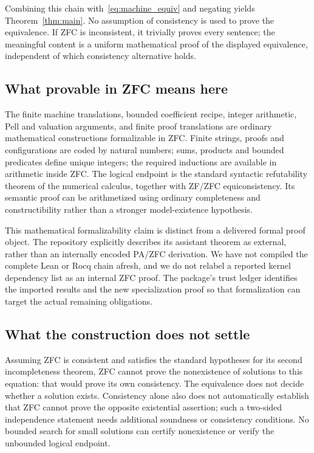 \documentclass[11pt]{article}
\begin{document}
Combining this chain with~\eqref{eq:machine_equiv} and negating yields Theorem~\ref{thm:main}. No assumption of consistency is used to prove the equivalence. If ZFC is inconsistent, it trivially proves every sentence; the meaningful content is a uniform mathematical proof of the displayed equivalence, independent of which consistency alternative holds.

\subsection{What provable in ZFC means here}
The finite machine translations, bounded coefficient recipe, integer arithmetic, Pell and valuation arguments, and finite proof translations are ordinary mathematical constructions formalizable in ZFC. Finite strings, proofs and configurations are coded by natural numbers; sums, products and bounded predicates define unique integers; the required inductions are available in arithmetic inside ZFC. The logical endpoint is the standard syntactic refutability theorem of the numerical calculus, together with ZF/ZFC equiconsistency. Its semantic proof can be arithmetized using ordinary completeness and constructibility rather than a stronger model-existence hypothesis.

This mathematical formalizability claim is distinct from a delivered formal proof object. The repository explicitly describes its assistant theorem as external, rather than an internally encoded PA/ZFC derivation. We have not compiled the complete Lean or Rocq chain afresh, and we do not relabel a reported kernel dependency list as an internal ZFC proof. The package's trust ledger identifies the imported results and the new specialization proof so that formalization can target the actual remaining obligations.

\subsection{What the construction does not settle}
Assuming ZFC is consistent and satisfies the standard hypotheses for its second incompleteness theorem, ZFC cannot prove the nonexistence of solutions to this equation: that would prove its own consistency. The equivalence does not decide whether a solution exists. Consistency alone also does not automatically establish that ZFC cannot prove the opposite existential assertion; such a two-sided independence statement needs additional soundness or consistency conditions. No bounded search for small solutions can certify nonexistence or verify the unbounded logical endpoint.
\end{document}
